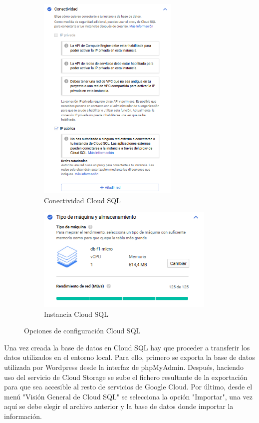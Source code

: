 \begin{figure}[ht]
\begin{subfigure}{0.5\textwidth}
\includegraphics[width=0.9\linewidth, height=10cm]{Figuras/ConectividadSQL.PNG}
\caption{Conectividad Cloud SQL}
\label{fig:conectividadSQL}
\end{subfigure}
\begin{subfigure}{0.5\textwidth}
\includegraphics[width=0.9\linewidth, height=5cm]{Figuras/InstanciaCloudSQL.PNG}
\caption{Instancia Cloud SQL}
\label{fig:instanciaSQL}
\end{subfigure}

\caption{Opciones de configuración Cloud SQL}
\label{fig:configuracionCloudSQL}
\end{figure}

Una vez creada la base de datos en Cloud SQL hay que proceder a transferir los datos utilizados en el entorno local. Para ello, primero se exporta la base de datos utilizada por Wordpress desde la interfaz de phpMyAdmin. Después, haciendo uso del servicio de Cloud Storage se sube el fichero resultante de la exportación para que sea accesible al resto de servicios de Google Cloud. Por último, desde el menú "Visión General de Cloud SQL" se selecciona la opción "Importar", una vez aquí se debe elegir el archivo anterior y la base de datos donde importar la información.

